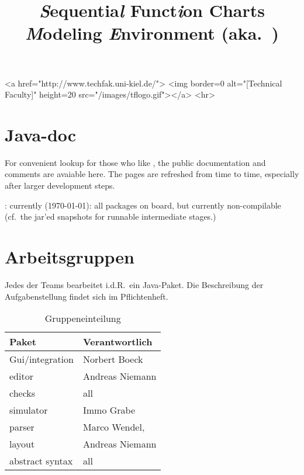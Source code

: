 \documentclass[11pt,german]{article}
\title{{\huge\bf \textsl{S}equentia\textsl{l} Funct\textsl{i}on Charts
    \textsl{M}odeling \textsl{E}nvironment (aka.\ \Slime)}}
\date{}
\begin{document}
\vspace{-2cm}



\begin{rawhtml}
<a href="http://www.techfak.uni-kiel.de/">
  <img border=0 alt="[Technical Faculty]" height=20  src="/images/tflogo.gif"></a>
<hr>
\end{rawhtml}


\maketitle{}






\section*{Java-doc}
\label{sec:javadoc}
\label{sec:html-doc}



For convenient lookup for those who like \javadoc, the public documentation
and comments are avaiable here. The pages are refreshed from time to time,
especially after larger development steps.

\begin{center}
  : currently (\today): all
  packages on board, but currently non-compilable (cf.\ the jar'ed
  snapshots for runnable intermediate stages.)
\end{center}

















\section*{Arbeitsgruppen}
\label{sec:gruppen}

Jedes der Teams bearbeitet i.d.R.\ ein Java-Paket. Die Beschreibung der
Aufgabenstellung findet sich im Pflichtenheft.

\begin{table}[htbp]
  \centering
  \begin{tabular}[t]{l@{\quad\quad}l}
     Paket  &  Verantwortlich
     \\\hline
     Gui/integration & Norbert Boeck
     \\
     editor & Andreas Niemann
     \\
     checks & all
     \\
     simulator & Immo Grabe
     \\
     parser & Marco Wendel,
     \\
     layout & Andreas Niemann
     \\
     abstract syntax & all
  \end{tabular}
  \caption{Gruppeneinteilung}
  \label{tab:gruppen}
\end{table}
\end{document}
